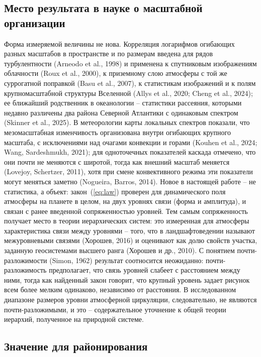 \documentclass[12pt,a4paper]{article}
\begin{document}
\subsection{Место результата в науке о масштабной организации}

Форма измеряемой величины не нова. Корреляция логарифмов огибающих разных масштабов в пространстве и по размерам введена для рядов турбулентности (Arneodo et al., 1998) и применена к спутниковым изображениям облачности (Roux et al., 2000), к приземному слою атмосферы с той же суррогатной поправкой (Basu et al., 2007), к статистикам изображений и к полям крупномасштабной структуры Вселенной (Allys et al., 2020; Cheng et al., 2024); ее ближайший родственник в океанологии -- статистики рассеяния, которыми недавно различены два района Северной Атлантики с одинаковым спектром (Skinner et al., 2025). В метеорологии карты локальных спектров показали, что мезомасштабная изменчивость организована внутри огибающих крупного масштаба, с исключениями над очагами конвекции и горами (Kouhen et al., 2024; Wang, Sardeshmukh, 2021); для одноточечных показателей каскада отмечено, что они почти не меняются с широтой, тогда как внешний масштаб меняется (Lovejoy, Schertzer, 2011), хотя при смене конвективного режима эти показатели могут меняться заметно (Nogueira, Barros, 2014). Новое в настоящей работе -- не статистика, а объект: закон~(\ref{eq:law}) проверен для динамического поля атмосферы на планете в целом, на двух уровнях связи (форма и амплитуда), и связан с ранее введенной сопряженностью уровней. Тем самым сопряженность получает место в теории иерархических систем: это измеренная для атмосферы характеристика связи между уровнями -- того, что в ландшафтоведении называют межуровневыми связями (Хорошев, 2016) и оценивают как долю свойств участка, заданную геосистемами высшего ранга (Хорошев и др., 2010). С понятием почти-разложимости (Simon, 1962) результат соотносится неожиданно: почти-разложимость предполагает, что связь уровней слабеет с расстоянием между ними, тогда как найденный закон говорит, что крупный уровень задает рисунок всем более мелким одинаково, независимо от расстояния. В исследованном диапазоне размеров уровни атмосферной циркуляции, следовательно, не являются почти-разложимыми, и это -- содержательное уточнение к общей теории иерархий, полученное на природной системе.

\subsection{Значение для районирования}
\end{document}
